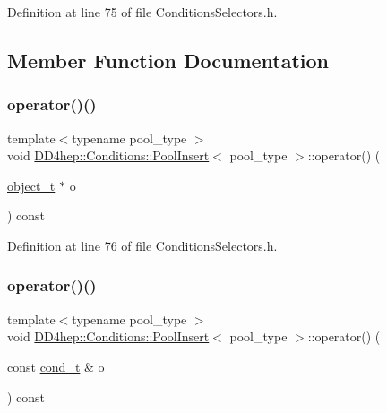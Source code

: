 Definition at line 75 of file Conditions\+Selectors.\+h.



\subsection{Member Function Documentation}
\hypertarget{class_d_d4hep_1_1_conditions_1_1_pool_insert_a92cda97188d7e05582e36efb071f17aa}{}\label{class_d_d4hep_1_1_conditions_1_1_pool_insert_a92cda97188d7e05582e36efb071f17aa} 
\subsubsection{\texorpdfstring{operator()()}{operator()()}\hspace{0.1cm}{\footnotesize\ttfamily [1/4]}}
{\footnotesize\ttfamily template$<$typename pool\+\_\+type $>$ \\
void \hyperlink{class_d_d4hep_1_1_conditions_1_1_pool_insert}{D\+D4hep\+::\+Conditions\+::\+Pool\+Insert}$<$ pool\+\_\+type $>$\+::operator() (\begin{DoxyParamCaption}\item[{\hyperlink{class_d_d4hep_1_1_conditions_1_1_cond_____oper_a4229491e49bfd21058dff10125a73f63}{object\+\_\+t} $\ast$}]{o }\end{DoxyParamCaption}) const\hspace{0.3cm}{\ttfamily [inline]}}



Definition at line 76 of file Conditions\+Selectors.\+h.

\hypertarget{class_d_d4hep_1_1_conditions_1_1_pool_insert_afe9fe7f1e796bc180cbb3e951e3380e1}{}\label{class_d_d4hep_1_1_conditions_1_1_pool_insert_afe9fe7f1e796bc180cbb3e951e3380e1} 
\subsubsection{\texorpdfstring{operator()()}{operator()()}\hspace{0.1cm}{\footnotesize\ttfamily [2/4]}}
{\footnotesize\ttfamily template$<$typename pool\+\_\+type $>$ \\
void \hyperlink{class_d_d4hep_1_1_conditions_1_1_pool_insert}{D\+D4hep\+::\+Conditions\+::\+Pool\+Insert}$<$ pool\+\_\+type $>$\+::operator() (\begin{DoxyParamCaption}\item[{const \hyperlink{class_d_d4hep_1_1_conditions_1_1_cond_____oper_aceca9f6a0e8c84364946eace47275d09}{cond\+\_\+t} \&}]{o }\end{DoxyParamCaption}) const\hspace{0.3cm}{\ttfamily [inline]}}



